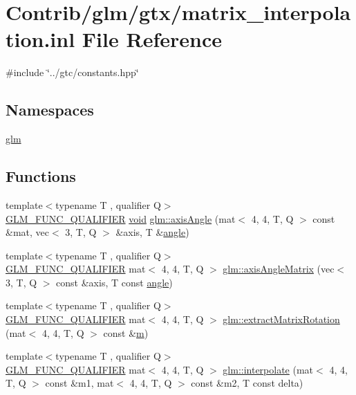 \hypertarget{matrix__interpolation_8inl}{}\section{Contrib/glm/gtx/matrix\+\_\+interpolation.inl File Reference}
\label{matrix__interpolation_8inl}
{\ttfamily \#include \char`\"{}../gtc/constants.\+hpp\char`\"{}}\newline
\subsection*{Namespaces}
\begin{DoxyCompactItemize}
\item 
 \mbox{\hyperlink{namespaceglm}{glm}}
\end{DoxyCompactItemize}
\subsection*{Functions}
\begin{DoxyCompactItemize}
\item 
{\footnotesize template$<$typename T , qualifier Q$>$ }\\\mbox{\hyperlink{setup_8hpp_a33fdea6f91c5f834105f7415e2a64407}{G\+L\+M\+\_\+\+F\+U\+N\+C\+\_\+\+Q\+U\+A\+L\+I\+F\+I\+ER}} \mbox{\hyperlink{_s_d_l__opengles2__gl2ext_8h_ae5d8fa23ad07c48bb609509eae494c95}{void}} \mbox{\hyperlink{group__gtx__matrix__interpolation_ga97f160158906ea89676f56cc4697ec98}{glm\+::axis\+Angle}} (mat$<$ 4, 4, T, Q $>$ const \&mat, vec$<$ 3, T, Q $>$ \&axis, T \&\mbox{\hyperlink{_s_d_l__opengl__glext_8h_a9e06c1f76a20fed54ca742cd25cb02c4}{angle}})
\item 
{\footnotesize template$<$typename T , qualifier Q$>$ }\\\mbox{\hyperlink{setup_8hpp_a33fdea6f91c5f834105f7415e2a64407}{G\+L\+M\+\_\+\+F\+U\+N\+C\+\_\+\+Q\+U\+A\+L\+I\+F\+I\+ER}} mat$<$ 4, 4, T, Q $>$ \mbox{\hyperlink{group__gtx__matrix__interpolation_ga992a5db71893ed1ba6ebac99f0f69831}{glm\+::axis\+Angle\+Matrix}} (vec$<$ 3, T, Q $>$ const \&axis, T const \mbox{\hyperlink{_s_d_l__opengl__glext_8h_a9e06c1f76a20fed54ca742cd25cb02c4}{angle}})
\item 
{\footnotesize template$<$typename T , qualifier Q$>$ }\\\mbox{\hyperlink{setup_8hpp_a33fdea6f91c5f834105f7415e2a64407}{G\+L\+M\+\_\+\+F\+U\+N\+C\+\_\+\+Q\+U\+A\+L\+I\+F\+I\+ER}} mat$<$ 4, 4, T, Q $>$ \mbox{\hyperlink{group__gtx__matrix__interpolation_ga8834d4499a1a52fcf531b4506f0b5f67}{glm\+::extract\+Matrix\+Rotation}} (mat$<$ 4, 4, T, Q $>$ const \&\mbox{\hyperlink{_s_d_l__opengl__glext_8h_af593500c283bf1a787a6f947f503a5c2}{m}})
\item 
{\footnotesize template$<$typename T , qualifier Q$>$ }\\\mbox{\hyperlink{setup_8hpp_a33fdea6f91c5f834105f7415e2a64407}{G\+L\+M\+\_\+\+F\+U\+N\+C\+\_\+\+Q\+U\+A\+L\+I\+F\+I\+ER}} mat$<$ 4, 4, T, Q $>$ \mbox{\hyperlink{group__gtx__matrix__interpolation_gad5fc63a2e084000b39f6508ab07421a5}{glm\+::interpolate}} (mat$<$ 4, 4, T, Q $>$ const \&m1, mat$<$ 4, 4, T, Q $>$ const \&m2, T const delta)
\end{DoxyCompactItemize}
